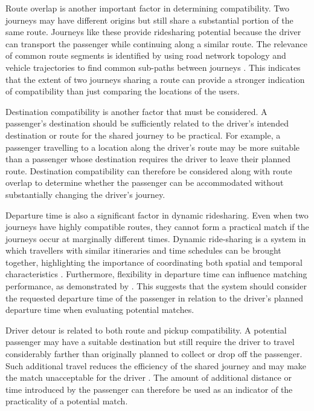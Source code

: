 Route overlap is another important factor in determining compatibility. Two journeys may have different origins but still share a substantial portion of the same route. Journeys like these provide ridesharing potential because the driver can transport the passenger while continuing along a similar route. The relevance of common route segments is identified by using road network topology and vehicle trajectories to find common sub-paths between journeys \citep{hong2017}. This indicates that the extent of two journeys sharing a route can provide a stronger indication of compatibility than just comparing the locations of the users.

Destination compatibility is another factor that must be considered. A passenger's destination should be sufficiently related to the driver's intended destination or route for the shared journey to be practical. For example, a passenger travelling to a location along the driver's route may be more suitable than a passenger whose destination requires the driver to leave their planned route. Destination compatibility can therefore be considered along with route overlap to determine whether the passenger can be accommodated without substantially changing the driver's journey.

Departure time is also a significant factor in dynamic ridesharing. Even when two journeys have highly compatible routes, they cannot form a practical match if the journeys occur at marginally different times. Dynamic ride-sharing is a system in which travellers with similar itineraries and time schedules can be brought together, highlighting the importance of coordinating both spatial and temporal characteristics \citep{agatz2012}. Furthermore, flexibility in departure time can influence matching performance, as demonstrated by \citet{stiglic2016}. This suggests that the system should consider the requested departure time of the passenger in relation to the driver's planned departure time when evaluating potential matches.

Driver detour is related to both route and pickup compatibility. A potential passenger may have a suitable destination but still require the driver to travel considerably farther than originally planned to collect or drop off the passenger. Such additional travel reduces the efficiency of the shared journey and may make the match unacceptable for the driver \citep{stiglic2016}. The amount of additional distance or time introduced by the passenger can therefore be used as an indicator of the practicality of a potential match.

